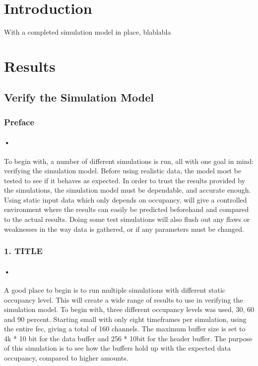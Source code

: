 \documentclass[a4paper, 12pt]{report}
\begin{document}
\section{Introduction}
With a completed simulation model in place, blablabla

\section{Results}

\subsection{Verify the Simulation Model}

\subsubsection{Preface}

\paragraph{•}
To begin with, a number of different simulations is run, all with one goal in mind: verifying the simulation model.
Before using realistic data, the model most be tested to see if it behaves as expected.
In order to trust the results provided by the simulations, the simulation model must be dependable, and accurate enough.
Using static input data which only depends on occupancy, will give a controlled environment where the results can easily be predicted beforehand and compared to the actual results.
Doing some test simulations will also flush out any flaws or weaknesses in the way data is gathered, or if any parameters must be changed.

\subsubsection{1. TITLE}
\paragraph{•}
A good place to begin is to run multiple simulations with different static occupancy level.
This will create a wide range of results to use in verifying the simulation model.
To begin with, three different occupancy levels was used, 30, 60 and 90 percent.
Starting small with only eight timeframes per simulation, using the entire \gls{fec}, giving a total of 160 channels.
The maximum buffer size is set to 4k * 10 bit for the data buffer and 256 * 10bit for the header buffer.
The purpose of this simulation is to see how the buffers hold up with the expected data occupancy, compared to higher amounts.
\end{document}
